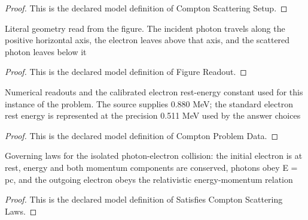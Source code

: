 \begin{proof}
  This is the declared model definition of Compton Scattering Setup.
\end{proof}
\begin{definition}
  \label{def:physics:phyx-mini-0531:phyxminiproblems-problemphyxmini0531-figurereadout}
  Literal geometry read from the figure. The incident photon travels along the positive horizontal axis, the electron leaves above that axis, and the scattered photon leaves below it
\end{definition}
\begin{proof}
  This is the declared model definition of Figure Readout.
\end{proof}
\begin{definition}
  \label{def:physics:phyx-mini-0531:phyxminiproblems-problemphyxmini0531-comptonproblemdata}
  Numerical readouts and the calibrated electron rest-energy constant used for this instance of the problem. The source supplies 0.880 MeV; the standard electron rest energy is represented at the precision 0.511 MeV used by the answer choices
\end{definition}
\begin{proof}
  This is the declared model definition of Compton Problem Data.
\end{proof}
\begin{definition}
  \label{def:physics:phyx-mini-0531:phyxminiproblems-problemphyxmini0531-satisfiescomptonscatteringlaws}
  Governing laws for the isolated photon-electron collision: the initial electron is at rest, energy and both momentum components are conserved, photons obey E = pc, and the outgoing electron obeys the relativistic energy-momentum relation
\end{definition}
\begin{proof}
  This is the declared model definition of Satisfies Compton Scattering Laws.
\end{proof}
